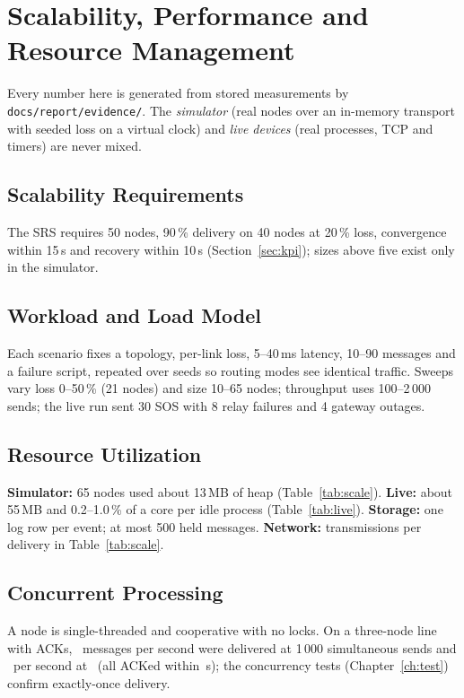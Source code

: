 \section{Scalability, Performance and Resource Management}
\label{ch:perf}





Every number here is generated from stored measurements by \texttt{docs/report/evidence/}. The \emph{simulator} (real nodes over an in-memory transport with seeded loss on a virtual clock) and \emph{live devices} (real processes, TCP and timers) are never mixed.

\subsection{Scalability Requirements}
The SRS requires 50 nodes, 90\,\% delivery on 40 nodes at 20\,\% loss, convergence within 15\,s and recovery within 10\,s (Section~\ref{sec:kpi}); sizes above five exist only in the simulator.
\subsection{Workload and Load Model}
Each scenario fixes a topology, per-link loss, 5--40\,ms latency, 10--90 messages and a failure script, repeated over seeds so routing modes see identical traffic. Sweeps vary loss 0--50\,\% (21 nodes) and size 10--65 nodes; throughput uses 100--2\,000 sends; the live run sent 30 SOS with 8 relay failures and 4 gateway outages.

\subsection{Resource Utilization}
\textbf{Simulator:} 65 nodes used about 13\,MB of heap (Table~\ref{tab:scale}). \textbf{Live:} about 55\,MB and 0.2--1.0\,\% of a core per idle process (Table~\ref{tab:live}). \textbf{Storage:} one log row per event; at most 500 held messages. \textbf{Network:} transmissions per delivery in Table~\ref{tab:scale}.
\subsection{Concurrent Processing}
A node is single-threaded and cooperative with no locks. On a three-node line with ACKs, \ThrMidRate\ messages per second were delivered at 1\,000 simultaneous sends and \ThrMaxRate\ per second at \ThrMaxN\ (all ACKed within \ThrMaxAck\,s); the concurrency tests (Chapter~\ref{ch:test}) confirm exactly-once delivery.

